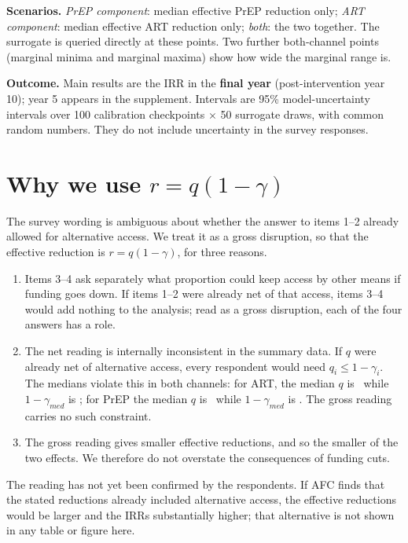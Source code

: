 \documentclass[10pt,a4paper]{article}
\begin{document}
\textbf{Scenarios.} \emph{PrEP component}: median effective PrEP reduction only; \emph{ART component}: median effective ART reduction only; \emph{both}: the two together. The surrogate is queried directly at these points. Two further both-channel points (marginal minima and marginal maxima) show how wide the marginal range is.

\textbf{Outcome.} Main results are the IRR in the \textbf{final year} (post-intervention year 10); year 5 appears in the supplement. Intervals are 95\% model-uncertainty intervals over 100 calibration checkpoints $\times$ 50 surrogate draws, with common random numbers. They do not include uncertainty in the survey responses.

\section{Why we use $r=q(1-\gamma)$}\label{sec:interp}
The survey wording is ambiguous about whether the answer to items 1--2 already allowed for alternative access. We treat it as a gross disruption, so that the effective reduction is $r=q(1-\gamma)$, for three reasons.
\begin{enumerate}[nosep]
\item Items 3--4 ask separately what proportion could keep access by other means if funding goes down. If items 1--2 were already net of that access, items 3--4 would add nothing to the analysis; read as a gross disruption, each of the four answers has a role.
\item The net reading is internally inconsistent in the summary data. If $q$ were already net of alternative access, every respondent would need $q_i\le 1-\gamma_i$. The medians violate this in both channels: for ART, the median $q$ is \QvMed\ while $1-\gamma_{med}$ is \OneMinusGaMed; for PrEP the median $q$ is \QpMed\ while $1-\gamma_{med}$ is \OneMinusGpMed. The gross reading carries no such constraint.
\item The gross reading gives smaller effective reductions, and so the smaller of the two effects. We therefore do not overstate the consequences of funding cuts.
\end{enumerate}
The reading has not yet been confirmed by the respondents. If AFC finds that the stated reductions already included alternative access, the effective reductions would be larger and the IRRs substantially higher; that alternative is not shown in any table or figure here.
\end{document}
